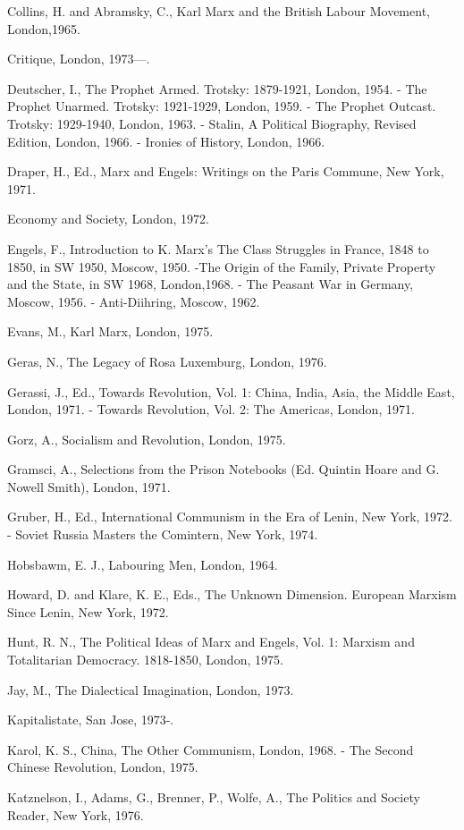 Collins, H. and Abramsky, C., Karl Marx and the British Labour Movement, London,1965.

Critique, London, 1973—.

Deutscher, I., The Prophet Armed. Trotsky: 1879-1921, London, 1954.
- The Prophet Unarmed. Trotsky: 1921-1929, London, 1959.
- The Prophet Outcast. Trotsky: 1929-1940, London, 1963.
- Stalin, A Political Biography, Revised Edition, London, 1966.
- Ironies of History, London, 1966.

Draper, H., Ed., Marx and Engels: Writings on the Paris Commune, New York, 1971.

Economy and Society, London, 1972.

Engels, F., Introduction to K. Marx's The Class Struggles in France, 1848 to 1850, in SW 1950, Moscow, 1950.
 -The Origin of the Family, Private Property and the State, in SW 1968, London,1968.
- The Peasant War in Germany, Moscow, 1956.
- Anti-Diihring, Moscow, 1962.

Evans, M., Karl Marx, London, 1975.

Geras, N., The Legacy of Rosa Luxemburg, London, 1976.

Gerassi, J., Ed., Towards Revolution, Vol. 1: China, India, Asia, the Middle East, London, 1971.
- Towards Revolution, Vol. 2: The Americas, London, 1971.

Gorz, A., Socialism and Revolution, London, 1975.

Gramsci, A., Selections from the Prison Notebooks (Ed. Quintin Hoare and G. Nowell Smith), London, 1971.

Gruber, H., Ed., International Communism in the Era of Lenin, New York, 1972.
- Soviet Russia Masters the Comintern, New York, 1974.

Hobsbawm, E. J., Labouring Men, London, 1964.

Howard, D. and Klare, K. E., Eds., The Unknown Dimension. European Marxism Since Lenin, New York, 1972.

Hunt, R. N., The Political Ideas of Marx and Engels, Vol. 1: Marxism and Totalitarian Democracy. 1818-1850, London, 1975.

Jay, M., The Dialectical Imagination, London, 1973.

Kapitalistate, San Jose, 1973-.

Karol, K. S., China, The Other Communism, London, 1968.
- The Second Chinese Revolution, London, 1975.

Katznelson, I., Adams, G., Brenner, P., Wolfe, A., The Politics and Society Reader, New York, 1976.

